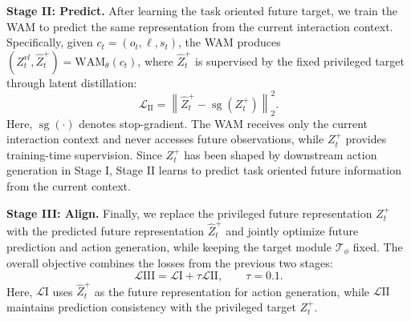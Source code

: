 \documentclass{article} %
\begin{document}

\textbf{Stage II: Predict.}
After learning the task oriented future target, we train the WAM to predict
the same representation from the current interaction context. Specifically,
given $c_t=(o_t,\ell,s_t)$, the WAM produces
$\left(Z_t^{vl},\hat{Z}_t^{+}\right)=\mathrm{WAM}_{\theta}(c_t)$,
where $\hat{Z}_t^{+}$ is supervised by the fixed privileged target through
latent distillation:
\begin{equation}
    \mathcal{L}_{\mathrm{II}}
    =
    \left\|
        \hat{Z}_t^{+}
        -
        \operatorname{sg}\!\left(Z_t^{+}\right)
    \right\|_2^2.
\end{equation}
Here, $\operatorname{sg}(\cdot)$ denotes stop-gradient. The WAM receives
only the current interaction context and never accesses future observations,
while $Z_t^{+}$ provides training-time supervision. Since $Z_t^{+}$ has been
shaped by downstream action generation in Stage I, Stage II learns to predict
task oriented future information from the current context.


\textbf{Stage III: Align.}
Finally, we replace the privileged future representation $Z_t^{+}$ with the
predicted future representation $\hat{Z}_t^{+}$ and jointly optimize future
prediction and action generation, while keeping the target module
$\mathcal{T}_{\phi}$ fixed. The overall objective combines the losses from the
previous two stages:
\begin{equation}
\mathcal{L}{\mathrm{III}}
=
\mathcal{L}{\mathrm{I}}
+
\tau\mathcal{L}{\mathrm{II}},
\qquad
\tau=0.1.
\end{equation}
Here, $\mathcal{L}{\mathrm{I}}$ uses $\hat{Z}_t^{+}$ as the future
representation for action generation, while $\mathcal{L}{\mathrm{II}}$
maintains prediction consistency with the privileged target $Z_t^{+}$.
\end{document}
